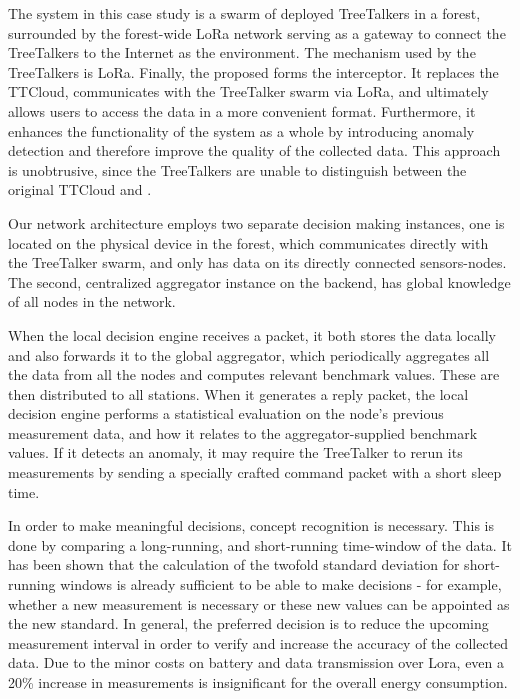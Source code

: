 The system in this case study is a swarm of deployed TreeTalkers in a forest,
surrounded by the forest-wide LoRa network serving as a gateway to connect the TreeTalkers to the Internet as the environment.
The mechanism used by the TreeTalkers is LoRa.
Finally, the proposed \ttt forms the interceptor.
It replaces the TTCloud, communicates with the TreeTalker swarm via LoRa, and ultimately allows users to access the data in a more convenient format.
Furthermore, it enhances the functionality of the system as a whole by introducing anomaly detection and therefore improve the quality of the collected data.
This approach is unobtrusive, since the TreeTalkers are unable to distinguish between the original TTCloud and \ttt.

Our network architecture employs two separate decision making instances, one is located on the physical device in the forest, which communicates directly with the TreeTalker swarm, and only has data on its directly connected sensors-nodes.
The second, centralized aggregator instance on the backend, has global knowledge of all nodes in the network.

When the local decision engine receives a packet, it both stores the data locally and also forwards it to the global aggregator, which periodically aggregates all the data from all the nodes and computes relevant benchmark values. 
These are then distributed to all stations.
When it generates a reply packet, the local decision engine performs a statistical evaluation on the node's previous measurement data, and how it relates to the aggregator-supplied benchmark values.
If it detects an anomaly, it may require the TreeTalker to rerun its measurements by sending a specially crafted command packet with a short sleep time.

In order to make meaningful decisions, concept recognition is necessary.
This is done by comparing a long-running, and short-running time-window of the data.
It has been shown that the calculation of the twofold standard deviation for short-running windows is already sufficient to be able to make decisions - for example, whether a new measurement is necessary or these new values can be appointed as the new standard.
In general, the preferred decision is to reduce the upcoming measurement interval in order to verify and increase the accuracy of the collected data.
Due to the minor costs on battery and data transmission over Lora, even a 20\% increase in measurements is insignificant for the overall energy consumption. 

